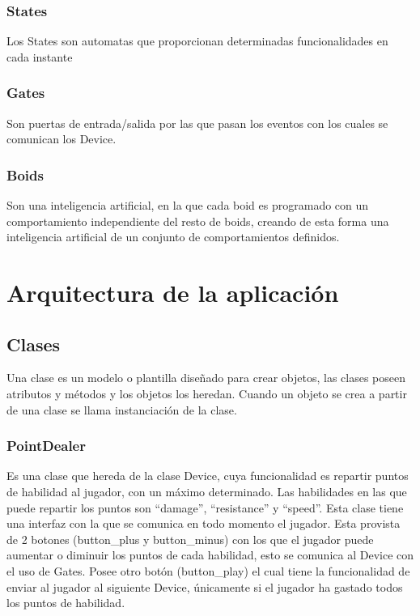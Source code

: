 \documentclass[a4paper,10pt]{article}
\begin{document}
\subsubsection{States}
Los States son automatas que proporcionan determinadas funcionalidades en cada instante

\subsubsection{Gates}
Son puertas de entrada/salida por las que pasan los eventos con los cuales se comunican los
Device.

\subsubsection{Boids}
Son una inteligencia artificial, en la que cada boid es programado con un comportamiento
independiente del resto de boids, creando de esta forma una inteligencia artificial de un
conjunto de comportamientos definidos.

\cleardoublepage

\section{Arquitectura de la aplicación}
\subsection{Clases}
Una clase es un modelo o plantilla diseñado para crear objetos, las clases poseen atributos y
métodos y los objetos los heredan. Cuando un objeto se crea a partir de una clase se llama
instanciación de la clase.
\subsubsection{PointDealer}
Es una clase que hereda de la clase Device, cuya funcionalidad 
es repartir puntos de habilidad al jugador, con un máximo determinado. 
Las habilidades en las que puede repartir los puntos son “damage”, 
“resistance” y “speed”. Esta clase tiene una interfaz con la que se 
comunica en todo momento el jugador. Esta provista de 2 botones (button\_plus
y button\_minus) con los que el jugador puede aumentar o diminuir los 
puntos de cada habilidad, esto se comunica al Device con el uso de Gates. 
Posee otro botón (button\_play) el cual tiene la funcionalidad de enviar al 
jugador al siguiente Device, únicamente si el jugador ha gastado todos los 
puntos de habilidad.
\end{document}

